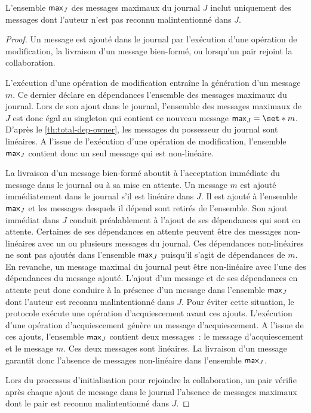 \begin{lemma}\label{th:max-without-known-malicious}
L'ensemble $\operatorname{\mathsf{max}}_J$ des messages maximaux du journal $J$ inclut uniquement des messages dont l'auteur n'est pas reconnu malintentionné dans $J$.
\end{lemma}
\begin{proof}
Un message est ajouté dans le journal par l'exécution d'une opération de modification, la livraison d'un message bien-formé, ou lorsqu'un pair rejoint la collaboration.

L'exécution d'une opération de modification entraîne la génération d'un message $m$.
Ce dernier déclare en dépendances l'ensemble des messages maximaux du journal.
Lors de son ajout dans le journal, l'ensemble des messages maximaux de $J$ est donc égal au singleton qui contient ce nouveau message $\trm{max}_J = \set*{m}$.
D'après le \autoref{th:total-dep-owner}, les messages du possesseur du journal sont linéaires.
A l'issue de l'exécution d'une opération de modification, l'ensemble $\operatorname{\mathsf{max}}_J$ contient donc un seul message qui est non-linéaire.

La livraison d'un message bien-formé aboutit à l'acceptation immédiate du message dans le journal ou à sa mise en attente.
Un message $m$ est ajouté immédiatement dans le journal s'il est linéaire dans $J$.
Il est ajouté à l'ensemble $\operatorname{\mathsf{max}}_J$ et les messages desquels il dépend sont retirés de l'ensemble.
Son ajout immédiat dans $J$ conduit préalablement à l'ajout de ses dépendances qui sont en attente.
Certaines de ses dépendances en attente peuvent être des messages non-linéaires avec un ou plusieurs messages du journal.
Ces dépendances non-linéaires ne sont pas ajoutés dans l'ensemble $\operatorname{\mathsf{max}}_J$ puisqu'il s'agit de dépendances de $m$.
En revanche, un message maximal du journal peut être non-linéaire avec l'une des dépendances du message ajouté.
L'ajout d'un message et de ses dépendances en attente peut donc conduire à la présence d'un message dans l'ensemble $\operatorname{\mathsf{max}}_J$ dont l'auteur est reconnu malintentionné dans $J$.
Pour éviter cette situation, le protocole exécute une opération d'acquiescement avant ces ajouts.
L'exécution d'une opération d'acquiescement génère un message d'acquiescement.
A l'issue de ces ajouts, l'ensemble $\operatorname{\mathsf{max}}_J$ contient deux messages~: le message d'acquiescement et le message $m$.
Ces deux messages sont linéaires.
La livraison d'un message garantit donc l'absence de messages non-linéaire dans l'ensemble $\operatorname{\mathsf{max}}_J$.

Lors du processus d'initialisation pour rejoindre la collaboration, un pair vérifie après chaque ajout de message dans le journal l'absence de messages maximaux dont le pair est reconnu malintentionné dans $J$.
\end{proof}

